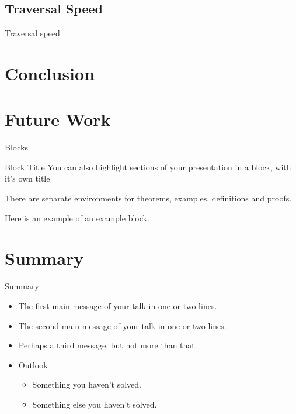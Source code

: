 \documentclass{beamer}
\begin{document}
\subsection{Traversal Speed}
\begin{frame}{Traversal speed}

\end{frame}

\section{Conclusion}
\section{Future Work}

\begin{frame}{Blocks}
\begin{block}{Block Title}
You can also highlight sections of your presentation in a block, with it's own title
\end{block}
\begin{theorem}
There are separate environments for theorems, examples, definitions and proofs.
\end{theorem}
\begin{example}
Here is an example of an example block.
\end{example}
\end{frame}

\section*{Summary}

\begin{frame}{Summary}
  \begin{itemize}
  \item
    The \alert{first main message} of your talk in one or two lines.
  \item
    The \alert{second main message} of your talk in one or two lines.
  \item
    Perhaps a \alert{third message}, but not more than that.
  \end{itemize}
  
  \begin{itemize}
  \item
    Outlook
    \begin{itemize}
    \item
      Something you haven't solved.
    \item
      Something else you haven't solved.
    \end{itemize}
  \end{itemize}
\end{frame}
\end{document}
